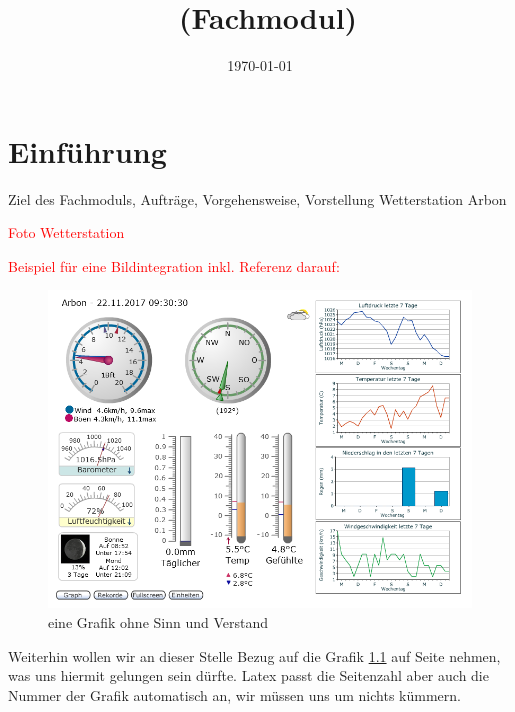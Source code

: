 \documentclass[a4paper,ngerman, 11pt]{report}
\title{\projektName~(Fachmodul)}
\author{\authorName}
\date{\today}
\newcommand\Diskussionspunkt[1]{\textcolor{red}{#1}}
\begin{document}

\setcounter{page}{2}
\tableofcontents          
\clearpage
{}






\chapter{Einführung}
Ziel des Fachmoduls, Aufträge, Vorgehensweise, Vorstellung Wetterstation Arbon

\Diskussionspunkt{Foto Wetterstation}


\Diskussionspunkt{Beispiel für eine Bildintegration inkl. Referenz darauf:}
\begin{figure}[htbp]
	\centering
	\includegraphics[width=0.9\linewidth]{img/grafik}
	\caption{eine Grafik ohne Sinn und Verstand}
	\label{img:grafik-dummy}
\end{figure}

Weiterhin wollen wir an dieser Stelle Bezug auf die Grafik
\ref{img:grafik-dummy} auf Seite \pageref{img:grafik-dummy} nehmen, was uns
hiermit gelungen sein dürfte. Latex passt die Seitenzahl aber auch die Nummer
der Grafik automatisch an, wir müssen uns um nichts kümmern.

\end{document}
